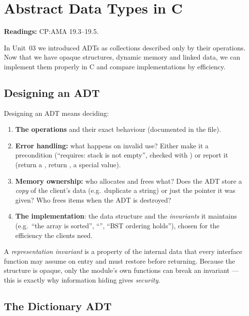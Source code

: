 \chapter{Abstract Data Types in C}

\textbf{Readings:} CP:AMA 19.3--19.5.

In Unit~03 we introduced ADTs as collections described only by their operations. Now that we
have opaque structures, dynamic memory and linked data, we can implement them properly in C and
compare implementations by efficiency.

\section{Designing an ADT}

Designing an ADT means deciding:
\begin{enumerate}
  \item \textbf{The operations} and their exact behaviour (documented in the  file).
  \item \textbf{Error handling:} what happens on invalid use? Either make it a precondition
    (``requires: stack is not empty'', checked with ) or report it (return a
    , return , a special value).
  \item \textbf{Memory ownership:} who allocates and frees what? Does the ADT store a
    \emph{copy} of the client's data (e.g.\ duplicate a string) or just the pointer it was
    given? Who frees items when the ADT is destroyed?
  \item \textbf{The implementation}: the data structure and the \emph{invariants} it maintains
    (e.g.\ ``the array is sorted'', ``'', ``BST ordering holds''), chosen for
    the efficiency the clients need.
\end{enumerate}

\begin{important}[Invariants]
A \emph{representation invariant} is a property of the internal data that every interface
function may assume on entry and must restore before returning. Because the structure is
opaque, only the module's own functions can break an invariant --- this is exactly why
information hiding gives \emph{security}.
\end{important}

\section{The Dictionary ADT}

